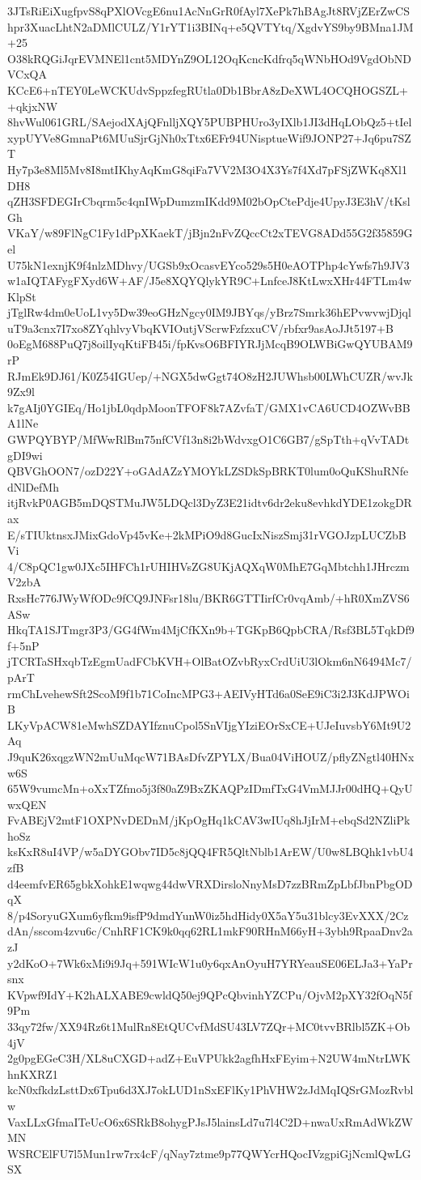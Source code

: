 3JTsRiEiXugfpvS8qPXlOVcgE6nu1AcNnGrR0fAyl7XePk7hBAgJt8RVjZErZwCS
hpr3XuacLhtN2aDMlCULZ/Y1rYT1i3BINq+e5QVTYtq/XgdvYS9by9BMna1JM+25
O38kRQGiJqrEVMNEl1cnt5MDYnZ9OL12OqKcncKdfrq5qWNbHOd9VgdObNDVCxQA
KCcE6+nTEY0LeWCKUdvSppzfegRUtla0Db1BbrA8zDeXWL4OCQHOGSZL++qkjxNW
8hvWul061GRL/SAejodXAjQFnlljXQY5PUBPHUro3yIXlb1JI3dHqLObQz5+tIel
xypUYVe8GmnaPt6MUuSjrGjNh0xTtx6EFr94UNisptueWif9JONP27+Jq6pu7SZT
Hy7p3e8Ml5Mv8I8mtIKhyAqKmG8qiFa7VV2M3O4X3Ys7f4Xd7pFSjZWKq8Xl1DH8
qZH3SFDEGIrCbqrm5c4qnIWpDumzmIKdd9M02bOpCtePdje4UpyJ3E3hV/tKslGh
VKaY/w89FlNgC1Fy1dPpXKaekT/jBjn2nFvZQccCt2xTEVG8ADd55G2f35859Gel
U75kN1exnjK9f4nlzMDhvy/UGSb9xOcasvEYco529s5H0eAOTPhp4cYwfs7h9JV3
w1aIQTAFygFXyd6W+AF/J5e8XQYQlykYR9C+LnfceJ8KtLwxXHr44FTLm4wKlpSt
jTglRw4dm0eUoL1vy5Dw39eoGHzNgcy0IM9JBYqs/yBrz7Smrk36hEPvwvwjDjql
uT9a3cnx7I7xo8ZYqhlvyVbqKVIOutjVScrwFzfzxuCV/rbfxr9asAoJJt5197+B
0oEgM688PuQ7j8oilIyqKtiFB45i/fpKvsO6BFIYRJjMcqB9OLWBiGwQYUBAM9rP
RJmEk9DJ61/K0Z54IGUep/+NGX5dwGgt74O8zH2JUWhsb00LWhCUZR/wvJk9Zx9l
k7gAIj0YGIEq/Ho1jbL0qdpMoonTFOF8k7AZvfaT/GMX1vCA6UCD4OZWvBBA1lNe
GWPQYBYP/MfWwRlBm75nfCVf13n8i2bWdvxgO1C6GB7/gSpTth+qVvTADtgDI9wi
QBVGhOON7/ozD22Y+oGAdAZzYMOYkLZSDkSpBRKT0lum0oQuKShuRNfedNlDefMh
itjRvkP0AGB5mDQSTMuJW5LDQcl3DyZ3E21idtv6dr2eku8evhkdYDE1zokgDRax
E/sTIUktnsxJMixGdoVp45vKe+2kMPiO9d8GucIxNiszSmj31rVGOJzpLUCZbBVi
4/C8pQC1gw0JXc5IHFCh1rUHIHVsZG8UKjAQXqW0MhE7GqMbtchh1JHrczmV2zbA
RxsHc776JWyWfODc9fCQ9JNFsr18lu/BKR6GTTIirfCr0vqAmb/+hR0XmZVS6ASw
HkqTA1SJTmgr3P3/GG4fWm4MjCfKXn9b+TGKpB6QpbCRA/Rsf3BL5TqkDf9f+5nP
jTCRTaSHxqbTzEgmUadFCbKVH+OlBatOZvbRyxCrdUiU3lOkm6nN6494Mc7/pArT
rmChLvehewSft2ScoM9f1b71CoIncMPG3+AEIVyHTd6a0SeE9iC3i2J3KdJPWOiB
LKyVpACW81eMwhSZDAYIfznuCpol5SnVIjgYIziEOrSxCE+UJeIuvsbY6Mt9U2Aq
J9quK26xqgzWN2mUuMqcW71BAsDfvZPYLX/Bua04ViHOUZ/pflyZNgtl40HNxw6S
65W9vumcMn+oXxTZfmo5j3f80aZ9BxZKAQPzIDmfTxG4VmMJJr00dHQ+QyUwxQEN
FvABEjV2mtF1OXPNvDEDnM/jKpOgHq1kCAV3wIUq8hJjIrM+ebqSd2NZliPkhoSz
ksKxR8uI4VP/w5aDYGObv7ID5c8jQQ4FR5QltNblb1ArEW/U0w8LBQhk1vbU4zfB
d4eemfvER65gbkXohkE1wqwg44dwVRXDirsloNnyMsD7zzBRmZpLbfJbnPbgODqX
8/p4SoryuGXum6yfkm9isfP9dmdYunW0iz5hdHidy0X5aY5u31blcy3EvXXX/2Cz
dAn/sscom4zvu6c/CnhRF1CK9k0qq62RL1mkF90RHnM66yH+3ybh9RpaaDnv2azJ
y2dKoO+7Wk6xMi9i9Jq+591WIcW1u0y6qxAnOyuH7YRYeauSE06ELJa3+YaPrsnx
KVpwf9IdY+K2hALXABE9cwldQ50ej9QPcQbvinhYZCPu/OjvM2pXY32fOqN5f9Pm
33qy72fw/XX94Rz6t1MulRn8EtQUCvfMdSU43LV7ZQr+MC0tvvBRlbl5ZK+Ob4jV
2g0pgEGeC3H/XL8uCXGD+adZ+EuVPUkk2agfhHxFEyim+N2UW4mNtrLWKhnKXRZ1
kcN0xfkdzLsttDx6Tpu6d3XJ7okLUD1nSxEFlKy1PhVHW2zJdMqIQSrGMozRvblw
VaxLLxGfmaITeUcO6x6SRkB8ohygPJsJ5lainsLd7u7l4C2D+nwaUxRmAdWkZWMN
WSRCElFU7l5Mun1rw7rx4cF/qNay7ztme9p77QWYcrHQocIVzgpiGjNcmlQwLGSX
